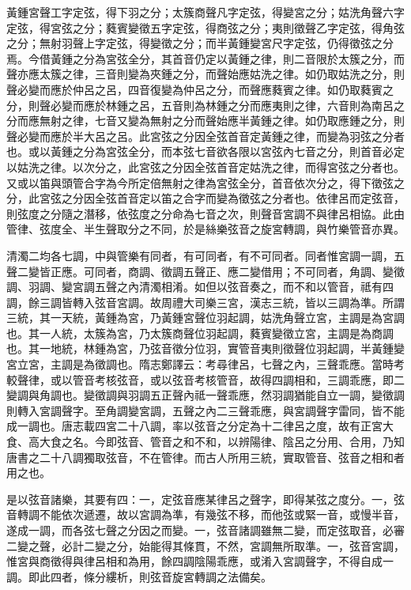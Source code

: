 \begin{pinyinscope}
黃鍾宮聲工字定弦，得下羽之分；太簇商聲凡字定弦，得變宮之分；姑洗角聲六字定弦，得宮弦之分；蕤賓變徵五字定弦，得商弦之分；夷則徵聲乙字定弦，得角弦之分；無射羽聲上字定弦，得變徵之分；而半黃鍾變宮尺字定弦，仍得徵弦之分焉。今借黃鍾之分為宮弦全分，其首音仍定以黃鍾之律，則二音限於太簇之分，而聲亦應太簇之律，三音則變為夾鍾之分，而聲始應姑洗之律。如仍取姑洗之分，則聲必變而應於仲呂之呂，四音復變為仲呂之分，而聲應蕤賓之律。如仍取蕤賓之分，則聲必變而應於林鍾之呂，五音則為林鍾之分而應夷則之律，六音則為南呂之分而應無射之律，七音又變為無射之分而聲始應半黃鍾之律。如仍取應鍾之分，則聲必變而應於半大呂之呂。此宮弦之分因全弦首音定黃鍾之律，而變為羽弦之分者也。或以黃鍾之分為宮弦全分，而本弦七音欲各限以宮弦內七音之分，則首音必定以姑洗之律。以次分之，此宮弦之分因全弦首音定姑洗之律，而得宮弦之分者也。又或以笛與頭管合字為今所定倍無射之律為宮弦全分，首音依次分之，得下徵弦之分，此宮弦之分因全弦首音定以笛之合字而變為徵弦之分者也。依律呂而定弦音，則弦度之分隨之潛移，依弦度之分命為七音之次，則聲音宮調不與律呂相協。此由管律、弦度全、半生聲取分之不同，於是絲樂弦音之旋宮轉調，與竹樂管音亦異。

清濁二均各七調，中與管樂有同者，有可同者，有不可同者。同者惟宮調一調，五聲二變皆正應。可同者，商調、徵調五聲正、應二變借用；不可同者，角調、變徵調、羽調、變宮調五聲之內清濁相淆。如但以弦音奏之，而不和以管音，祗有四調，餘三調皆轉入弦音宮調。故周禮大司樂三宮，漢志三統，皆以三調為準。所謂三統，其一天統，黃鍾為宮，乃黃鍾宮聲位羽起調，姑洗角聲立宮，主調是為宮調也。其一人統，太簇為宮，乃太簇商聲位羽起調，蕤賓變徵立宮，主調是為商調也。其一地統，林鍾為宮，乃弦音徵分位羽，實管音夷則徵聲位羽起調，半黃鍾變宮立宮，主調是為徵調也。隋志鄭譯云：考尋律呂，七聲之內，三聲乖應。當時考較聲律，或以管音考核弦音，或以弦音考核管音，故得四調相和，三調乖應，即二變調與角調也。變徵調與羽調五正聲內祗一聲乖應，然羽調猶能自立一調，變徵調則轉入宮調聲字。至角調變宮調，五聲之內二三聲乖應，與宮調聲字雷同，皆不能成一調也。唐志載四宮二十八調，率以弦音之分定為十二律呂之度，故有正宮大食、高大食之名。今即弦音、管音之和不和，以辨陽律、陰呂之分用、合用，乃知唐書之二十八調獨取弦音，不在管律。而古人所用三統，實取管音、弦音之相和者用之也。

是以弦音諸樂，其要有四：一，定弦音應某律呂之聲字，即得某弦之度分。一，弦音轉調不能依次遞遷，故以宮調為準，有幾弦不移，而他弦或緊一音，或慢半音，遂成一調，而各弦七聲之分因之而變。一，弦音諸調雖無二變，而定弦取音，必審二變之聲，必計二變之分，始能得其條貫，不然，宮調無所取準。一，弦音宮調，惟宮與商徵得與律呂相和為用，餘四調陰陽乖應，或淆入宮調聲字，不得自成一調。即此四者，條分縷析，則弦音旋宮轉調之法備矣。


\end{pinyinscope}
